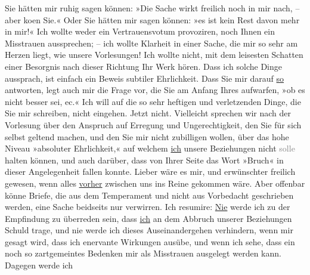 \begin{ledgroupsized}[t]{13cm}
           \pstart
           Sie hätten mir ruhig sagen können: »Die Sache wirkt freilich noch in mir nach, – aber
                  ko{\geminationm}en {\pb}Sie.« Oder Sie hätten mir sagen
               können: »es ist kein Rest davon mehr in mir!« Ich wollte weder ein Vertrauensvotum
               provoziren, noch Ihnen ein Misstrauen aussprechen; – ich wollte Klarheit in einer
               Sache, die mir so sehr am Herzen liegt, wie unsere Vorlesungen! Ich wollte nicht, mit
               dem leisesten Schatten einer Besorgnis nach dieser Richtung Ihr Werk hören. Dass ich solche Dinge
               aussprach, ist einfach ein Beweis subtiler Ehrlichkeit. Dass Sie mir darauf \uline{so} antworten, legt auch mir die Frage vor, die Sie am
               Anfang Ihres \label{K_L03355-4v}\label{K_L03355-4h} aufwarfen, »ob es nicht besser sei, ec.«\pend
           \pstart
           Ich will auf die so sehr heftigen und verletzenden Dinge, die Sie mir schreiben,
               nicht eingehen. Jetzt nicht. Vielleicht sprechen wir nach der Vorlesung über den
               Anspruch auf Erregung und Ungerechtigkeit, den Sie für sich selbst geltend machen,
               und den Sie mir nicht zubilligen wollen, über das hohe Niveau »absoluter
               Ehrlichkeit,« auf welchem \uline{ich} unsere Beziehungen
               nicht \textcolor{gray}{solle} halten können, und auch darüber, dass von Ihrer Seite
               das Wort »Bruch« in dieser Angelegenheit fallen konnte. Lieber wäre es mir, und
               erwünschter freilich gewesen, wenn alles \uline{vorher}
               zwischen uns ins Reine gekommen wäre. Aber offenbar könne
               Briefe, die aus dem Temperament und nicht aus Vorbedacht geschrieben werden, eine
               Sache beidseits nur verwirren. Ich resumire: \uline{Nie} werde ich {\pb}zu der Empfindung zu überreden
               sein, dass \uline{ich} an dem Abbruch unserer Beziehungen
               Schuld trage, und nie werde ich dieses Auseinandergehen verhindern, wenn mir gesagt
               wird, dass ich enervante Wirkungen ausübe, und wenn ich sehe, dass ein noch so
               zartgemeintes Bedenken mir als Misstrauen ausgelegt werden kann. Dagegen werde ich

\end{ledgroupsized}
